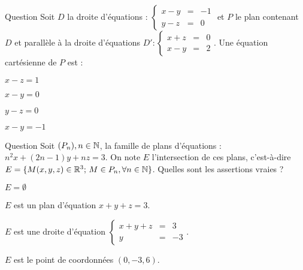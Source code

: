 \begin{multi}[multiple,feedback=
{\(\vec{u}(1,1,-1)\) est un vecteur directeur de la droite \(D'\) qui  n'appartient pas au  plan  \(y-z=0\) .   Donc \(P\) est différent du plan d'équation :  \(y-z=0\) et donc une équation cartésienne de \(P\) est  de la forme : \((x-y+1) + \alpha(y-z)=0, \, \alpha \in \Rr\). On calcule \(\alpha\) de sorte que \(\vec{u}(1,1,-1)\) soit un vecteur de  \(P\).
}]{Question}
Soit \(D\) la droite d'équations :  \( \left\{\begin{array}{ccl}x-y&=&-1\\y-z&=&0 \end{array}\right.\) et \(P\) le plan contenant \(D\) et parallèle à la droite d'équations  \(D' : \left\{\begin{array}{ccl}x+z&=&0\\x-y&=&2 \end{array}\right.\). 
Une équation cartésienne de \(P\) est :

    \item \(x-z=1\)
    \item \(x-y=0\)
    \item \(y-z=0\)
    \item* \(x-y=-1\)
\end{multi}


\begin{multi}[multiple,feedback=
{Soit \(M(x,y,z) \in E\), alors   \(n^2x+(2n-1)y+nz=3, \, \forall n \in \Nn  \Leftrightarrow  xn^2+ (2y+z)n-y-3=0, \, \forall n \in \Nn  \Leftrightarrow  x=0, 2y+z=0\) et \(y+3=0\).
}]{Question}
Soit \((P_n), n\in \mathbb{N}\), la famille de plans d'équations : \(n^2x+(2n-1)y+nz=3\). On note \(E\) l'intersection de ces plans, c'est-à-dire \(E= \{M(x,y,z) \in \mathbb{R}^3; \, M\in P_n, \forall n\in \mathbb{N} \}\). Quelles sont les assertions vraies ?

    \item \(E=\emptyset\)
    \item \(E\) est un plan d'équation \(x+y+z=3\).
    \item \(E\) est une droite d'équation \( \left\{\begin{array}{ccl}x+y+z&=&3\\y&=&-3 \end{array}\right.\).
    \item* \(E\) est le point de coordonnées \((0,-3,6)\).
\end{multi}



